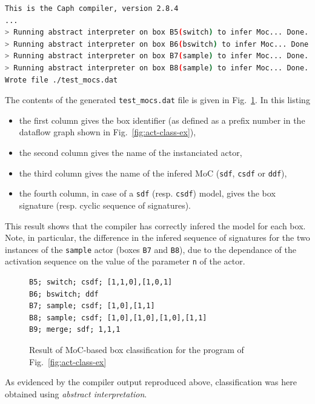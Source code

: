 \begin{lstlisting}[language=bash,basicstyle=\small]
This is the Caph compiler, version 2.8.4
...
> Running abstract interpreter on box B5(switch) to infer Moc... Done.
> Running abstract interpreter on box B6(bswitch) to infer Moc... Done.
> Running abstract interpreter on box B7(sample) to infer Moc... Done.
> Running abstract interpreter on box B8(sample) to infer Moc... Done.
Wrote file ./test_mocs.dat
\end{lstlisting}

The contents of the generated \verb|test_mocs.dat| file is given in Fig.~\ref{fig:act-class-res}. In
this listing 
\begin{itemize}
\item the first column gives the box identifier (as defined as a prefix number in the dataflow graph
  shown in Fig.~\ref{fig:act-class-ex}),
\item the second column gives the name of the instanciated actor,
\item the third column gives the name of the  infered MoC (\verb|sdf|, \verb|csdf| or \verb|ddf|),
\item the fourth column, in case of a \verb|sdf| (resp. \verb|csdf|) model, gives the box signature
  (resp. cyclic sequence of signatures).
\end{itemize}
This result shows that the compiler has correctly infered the model for each box. Note, in
particular, the difference in the infered sequence of signatures for the two instances of
the \verb|sample| actor (boxes \verb|B7| and \verb|B8|), due to the dependance of the activation
sequence on the value of the parameter \verb|n| of the actor.

\begin{figure}[H]
  \centering
\begin{verbatim}
B5; switch; csdf; [1,1,0],[1,0,1]
B6; bswitch; ddf
B7; sample; csdf; [1,0],[1,1]
B8; sample; csdf; [1,0],[1,0],[1,0],[1,1]
B9; merge; sdf; 1,1,1
\end{verbatim}
  \caption{Result of MoC-based box classification for the program of Fig.~\ref{fig:act-class-ex}}
  \label{fig:act-class-res}
\end{figure}

As evidenced by the compiler output reproduced above, classification was here obtained 
using \emph{abstract interpretation}.

